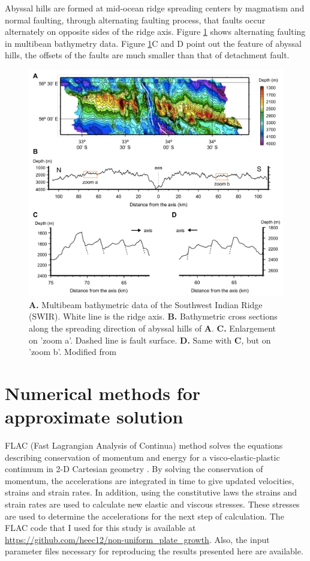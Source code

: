 \documentclass[letterpaper,12pt,notitle]{memphisthesis}                     %
\begin{document}
Abyssal hills are formed at mid-ocean ridge spreading centers by magmatism and normal faulting, through alternating faulting process, that faults occur alternately on opposite sides of the ridge axis. Figure \ref{fig:abyssalhill} shows alternating faulting in multibean bathymetry data. Figure \ref{fig:abyssalhill}C and D point out the feature of abyssal hills, the offsets of the faults are much smaller than that of detachment fault.
%
\begin{figure}[!htb]
	\centering
	\includegraphics[width=0.98\linewidth]{./figs/abyssalhill.pdf}
	\caption{\textbf{A.} Multibeam bathymetric data of the Southwest Indian Ridge (SWIR). White line is the ridge axis. \textbf{B.} Bathymetric cross sections along the spreading direction of abyssal hills of \textbf{A}. \textbf{C.} Enlargement on 'zoom a'. Dashed line is fault surface. \textbf{D.} Same with \textbf{C}, but on 'zoom b'. Modified from \citet{Mendel2003}}
	\label{fig:abyssalhill}
\end{figure}
%

\section{Numerical methods for approximate solution}
FLAC (Fast Lagrangian Analysis of Continua) method \citep{Cundall1982, Poliakov1993} solves the equations describing conservation of momentum and energy for a visco-elastic-plastic continuum in 2-D Cartesian geometry \citep{Lavier2002}. By solving the conservation of momentum, the accelerations are integrated in time to give updated velocities, strains and strain rates. In addition, using the constitutive laws the strains and strain rates are used to calculate new elastic and viscous stresses. These stresses are used to determine the accelerations for the next step of calculation. The FLAC code that I used for this study is available at \url{https://github.com/heec12/non-uniform_plate_growth}. Also, the input parameter files necessary for reproducing the results presented here are available.
\end{document}
